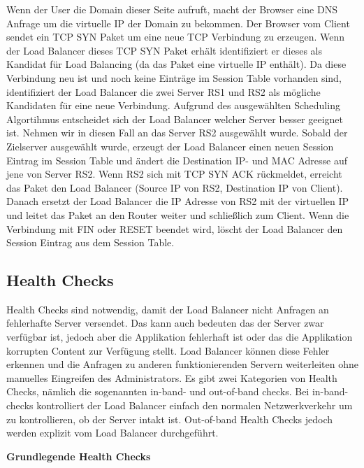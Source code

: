 Wenn der User die Domain dieser Seite aufruft, macht der Browser eine DNS Anfrage um die virtuelle IP der Domain zu bekommen. Der Browser vom Client sendet ein TCP SYN Paket um eine neue TCP Verbindung zu erzeugen. Wenn der Load Balancer dieses TCP SYN Paket erhält identifiziert er dieses als Kandidat für Load Balancing (da das Paket eine virtuelle IP enthält). Da diese Verbindung neu ist und noch keine Einträge im Session Table vorhanden sind, identifiziert der Load Balancer die zwei Server RS1 und RS2 als mögliche Kandidaten für eine neue Verbindung. Aufgrund des ausgewählten Scheduling Algortihmus entscheidet sich der Load Balancer welcher Server besser geeignet ist. Nehmen wir in diesen Fall an das Server RS2 ausgewählt wurde. Sobald der Zielserver ausgewählt wurde, erzeugt der Load Balancer einen neuen Session Eintrag im Session Table und ändert die Destination IP- und MAC Adresse auf jene von Server RS2. Wenn RS2 sich mit TCP SYN ACK rückmeldet, erreicht das Paket den Load Balancer (Source IP von RS2, Destination IP von Client). Danach ersetzt der Load Balancer die IP Adresse von RS2 mit der virtuellen IP und leitet das Paket an den Router weiter und schließlich zum Client. Wenn die Verbindung mit FIN oder RESET beendet wird, löscht der Load Balancer den Session Eintrag aus dem Session Table. \cite{LoadBalancing2}

\subsection{Health Checks}
\label{sec:Health Checks}

Health Checks sind notwendig, damit der Load Balancer nicht Anfragen an fehlerhafte Server versendet. Das kann auch bedeuten das der Server zwar verfügbar ist, jedoch aber die Applikation fehlerhaft ist oder das die Applikation korrupten Content zur Verfügung stellt. Load Balancer können diese Fehler erkennen und die Anfragen zu anderen funktionierenden Servern weiterleiten ohne manuelles Eingreifen des Administrators. Es gibt zwei Kategorien von Health Checks, nämlich die sogenannten in-band- und out-of-band checks. Bei in-band-checks kontrolliert der Load Balancer einfach den normalen Netzwerkverkehr um zu kontrollieren, ob der Server intakt ist. Out-of-band Health Checks jedoch werden explizit vom Load Balancer durchgeführt.\vspace{5mm}

\textbf{Grundlegende Health Checks} \\


